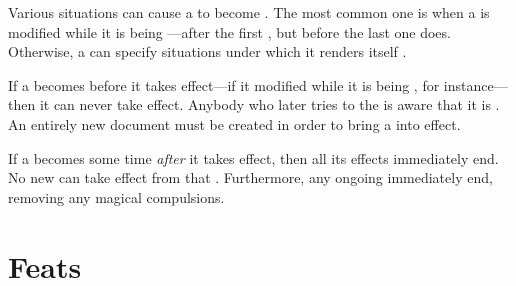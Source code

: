 Various situations can cause a {\contract} to become {\void}.
The most common one is when a {\contract} is modified while it is being {\signed}---after the first {\signatory} {\signs}, but before the last one does.
Otherwise, a {\contract} can specify situations under which it renders itself {\void}.

If a {\contract} becomes {\void} before it takes effect---if it modified while it is being {\signed}, for instance---then it can never take effect.
Anybody who later tries to {\sign} the {\contract} is aware that it is {\void}.
An entirely new document must be created in order to bring a {\contract} into effect.

If a {\contract} becomes {\void} some time \emph{after} it takes effect, then all its effects immediately end.
No new {\penalties} can take effect from that {\contract}.
Furthermore, any ongoing {\penalties} immediately end, removing any magical compulsions.

\section{Feats}



